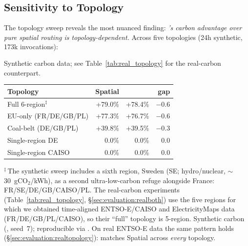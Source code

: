\subsection{Sensitivity to Topology}
\label{sec:evaluation:topology}

The topology sweep reveals the most nuanced finding: \emph{\GreenFaaS's
carbon advantage over pure spatial routing is topology-dependent.}
Across five topologies (24h synthetic, 173k invocations):

\begin{center}\small
Synthetic carbon data; see Table~\ref{tab:real_topology} for the
real-carbon counterpart.

\begin{tabular}{lrrr}
\toprule
Topology               & Spatial   & \GreenFaaS{} & gap \\
\midrule
Full 6-region$^\ddagger$ & +79.0\%  & +78.4\% & $-0.6$ \\
EU-only (FR/DE/GB/PL)  & +77.3\%  & +76.7\% & $-0.6$ \\
Coal-belt (DE/GB/PL)   & +39.8\%  & +39.5\% & $-0.3$ \\
Single-region DE       &   0.0\%   &   0.0\%  & 0.0 \\
Single-region CAISO    &   0.0\%   &   0.0\%  & 0.0 \\
\bottomrule
\end{tabular}

{\footnotesize $^\ddagger$\,The synthetic sweep includes a sixth
region, Sweden (SE; hydro/nuclear, $\sim$30~gCO$_2$/kWh), as a second
ultra-low-carbon refuge alongside France: FR/SE/DE/GB/CAISO/PL. The
real-carbon experiments
(Table~\ref{tab:real_topology}, \S\ref{sec:evaluation:realboth}) use
the five regions for which we obtained time-aligned ENTSO-E/CAISO and
ElectricityMaps data (FR/DE/GB/PL/CAISO), so their ``full'' topology
is 5-region. Synthetic carbon (,
seed~7); reproducible via . On real
ENTSO-E data the same pattern holds (\S\ref{sec:evaluation:realtopology}):
\GreenFaaS{} matches Spatial across \emph{every} topology.}
\end{center}

